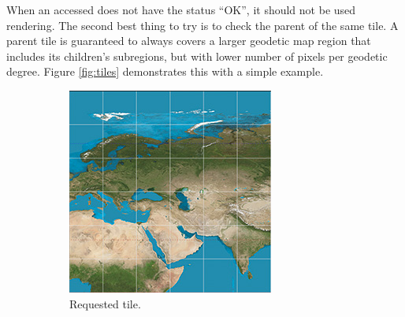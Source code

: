 When an accessed  does not have the status ``OK'', it should not be used rendering. The second best thing to try is to check the parent of the same tile. A parent tile is guaranteed to always covers a larger geodetic map region that includes its children's subregions, but with lower number of pixels per geodetic degree. Figure \ref{fig:tiles} demonstrates this with a simple example.

\begin{figure}[htbp]
    \centering
    \begin{subfigure}[t]{0.3\textwidth}
        \includegraphics[width=\textwidth]{figures/implementation/chunktile/chunktile1.jpg}
        \caption{Requested tile.}
    \end{subfigure}
    \quad
    \begin{subfigure}[t]{0.3\textwidth}

\end{subfigure}
\end{figure}
